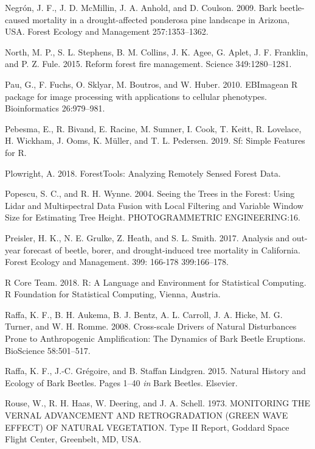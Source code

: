 \documentclass[]{article}
\begin{document}
\hypertarget{ref-negron2009}{}
Negrón, J. F., J. D. McMillin, J. A. Anhold, and D. Coulson. 2009. Bark
beetle-caused mortality in a drought-affected ponderosa pine landscape
in Arizona, USA. Forest Ecology and Management 257:1353--1362.

\hypertarget{ref-north2015}{}
North, M. P., S. L. Stephens, B. M. Collins, J. K. Agee, G. Aplet, J. F.
Franklin, and P. Z. Fule. 2015. Reform forest fire management. Science
349:1280--1281.

\hypertarget{ref-pau2010}{}
Pau, G., F. Fuchs, O. Sklyar, M. Boutros, and W. Huber. 2010. EBImagean
R package for image processing with applications to cellular phenotypes.
Bioinformatics 26:979--981.

\hypertarget{ref-pebesma2019}{}
Pebesma, E., R. Bivand, E. Racine, M. Sumner, I. Cook, T. Keitt, R.
Lovelace, H. Wickham, J. Ooms, K. Müller, and T. L. Pedersen. 2019. Sf:
Simple Features for R.

\hypertarget{ref-plowright2018}{}
Plowright, A. 2018. ForestTools: Analyzing Remotely Sensed Forest Data.

\hypertarget{ref-popescu2004}{}
Popescu, S. C., and R. H. Wynne. 2004. Seeing the Trees in the Forest:
Using Lidar and Multispectral Data Fusion with Local Filtering and
Variable Window Size for Estimating Tree Height. PHOTOGRAMMETRIC
ENGINEERING:16.

\hypertarget{ref-preisler2017}{}
Preisler, H. K., N. E. Grulke, Z. Heath, and S. L. Smith. 2017. Analysis
and out-year forecast of beetle, borer, and drought-induced tree
mortality in California. Forest Ecology and Management. 399: 166-178
399:166--178.

\hypertarget{ref-rcoreteam2018}{}
R Core Team. 2018. R: A Language and Environment for Statistical
Computing. R Foundation for Statistical Computing, Vienna, Austria.

\hypertarget{ref-raffa2008}{}
Raffa, K. F., B. H. Aukema, B. J. Bentz, A. L. Carroll, J. A. Hicke, M.
G. Turner, and W. H. Romme. 2008. Cross-scale Drivers of Natural
Disturbances Prone to Anthropogenic Amplification: The Dynamics of Bark
Beetle Eruptions. BioScience 58:501--517.

\hypertarget{ref-raffa2015}{}
Raffa, K. F., J.-C. Grégoire, and B. Staffan Lindgren. 2015. Natural
History and Ecology of Bark Beetles. Pages 1--40 \emph{in} Bark Beetles.
Elsevier.

\hypertarget{ref-rouse1973}{}
Rouse, W., R. H. Haas, W. Deering, and J. A. Schell. 1973. MONITORING
THE VERNAL ADVANCEMENT AND RETROGRADATION (GREEN WAVE EFFECT) OF NATURAL
VEGETATION. Type II Report, Goddard Space Flight Center, Greenbelt, MD,
USA.
\end{document}
